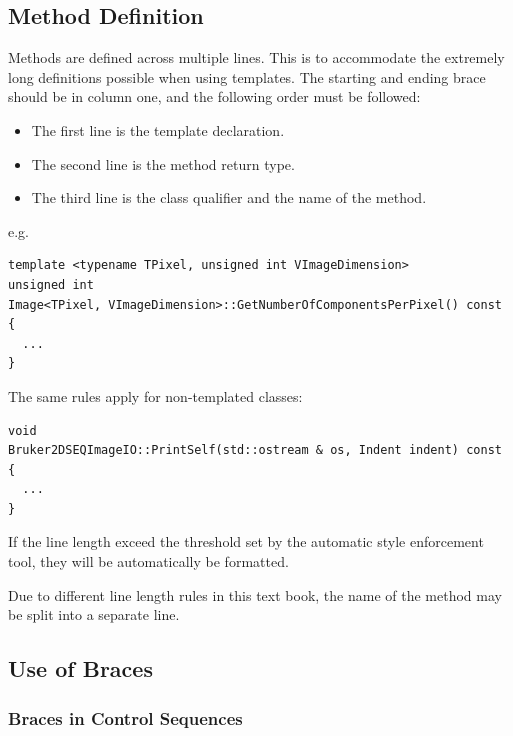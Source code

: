 \subsection{Method Definition}%
\label{subsec:MethodDefinition}

Methods are defined across multiple lines. This is to accommodate the extremely
long definitions possible when using templates. The starting and ending brace
should be in column one, and the following order must be followed:
\begin{itemize}
\item The first line is the template declaration.
\item The second line is the method return type.
\item The third line is the class qualifier and the name of the method.
\end{itemize}

e.g.

\small
\begin{verbatim}
template <typename TPixel, unsigned int VImageDimension>
unsigned int
Image<TPixel, VImageDimension>::GetNumberOfComponentsPerPixel() const
{
  ...
}
\end{verbatim}
\normalsize

The same rules apply for non-templated classes:

\small
\begin{verbatim}
void
Bruker2DSEQImageIO::PrintSelf(std::ostream & os, Indent indent) const
{
  ...
}
\end{verbatim}
\normalsize

If the line length exceed the threshold set by the automatic style
enforcement tool, they will be automatically be formatted.

Due to different line length rules in this text book, the name of the method
may be split into a separate line.


\subsection{Use of Braces}%
\label{subsec:UseOfBraces}


\subsubsection{Braces in Control Sequences}%
\label{subsubsec:BracesInControlSequences}

